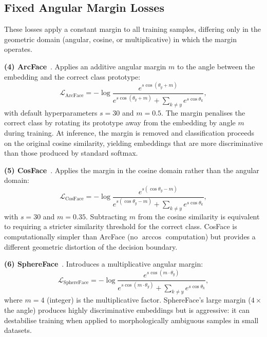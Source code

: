 \subsection{Fixed Angular Margin Losses}
\label{sec:bg:fixed_margins}

These losses apply a constant margin to all training samples, differing only in the geometric domain (angular, cosine, or multiplicative) in which the margin operates.

\textbf{(4) ArcFace}~\cite{deng2019arcface}.
Applies an additive angular margin $m$ to the angle between the embedding and the correct class prototype:
\begin{equation}
\label{eq:arcface}
\mathcal{L}_{\text{ArcFace}} = -\log \frac{e^{s \cos(\theta_y + m)}}{e^{s \cos(\theta_y + m)} + \sum_{k \neq y} e^{s \cos\theta_k}},
\end{equation}
with default hyperparameters $s = 30$ and $m = 0.5$.
The margin penalises the correct class by rotating its prototype away from the embedding by angle $m$ during training.
At inference, the margin is removed and classification proceeds on the original cosine similarity, yielding embeddings that are more discriminative than those produced by standard softmax.

\textbf{(5) CosFace}~\cite{wang2018cosface}.
Applies the margin in the cosine domain rather than the angular domain:
\begin{equation}
\label{eq:cosface}
\mathcal{L}_{\text{CosFace}} = -\log \frac{e^{s(\cos\theta_y - m)}}{e^{s(\cos\theta_y - m)} + \sum_{k \neq y} e^{s \cos\theta_k}},
\end{equation}
with $s = 30$ and $m = 0.35$.
Subtracting $m$ from the cosine similarity is equivalent to requiring a stricter similarity threshold for the correct class.
CosFace is computationally simpler than ArcFace (no $\arccos$ computation) but provides a different geometric distortion of the decision boundary.

\textbf{(6) SphereFace}~\cite{liu2017sphereface}.
Introduces a multiplicative angular margin:
\begin{equation}
\label{eq:sphereface}
\mathcal{L}_{\text{SphereFace}} = -\log \frac{e^{s \cos(m \cdot \theta_y)}}{e^{s \cos(m \cdot \theta_y)} + \sum_{k \neq y} e^{s \cos\theta_k}},
\end{equation}
where $m = 4$ (integer) is the multiplicative factor.
SphereFace's large margin ($4\times$ the angle) produces highly discriminative embeddings but is aggressive: it can destabilise training when applied to morphologically ambiguous samples in small datasets.

